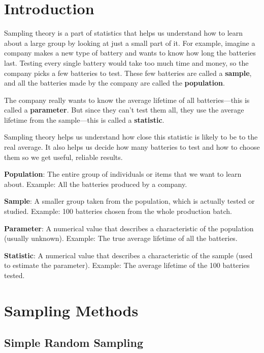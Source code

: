 \documentclass[twoside]{book}
\begin{document}
\section{Introduction}
Sampling theory is a part of statistics that helps us understand how to learn about a large group by looking at just a small part of it. For example, imagine a company makes a new type of battery and wants to know how long the batteries last. Testing every single battery would take too much time and money, so the company picks a few batteries to test. These few batteries are called a \textbf{sample}, and all the batteries made by the company are called the \textbf{population}.

The company really wants to know the average lifetime of all batteries—this is called a \textbf{parameter}. But since they can’t test them all, they use the average lifetime from the sample—this is called a \textbf{statistic}.

Sampling theory helps us understand how close this statistic is likely to be to the real average. It also helps us decide how many batteries to test and how to choose them so we get useful, reliable results.

\begin{textbox}
    \textbf{Population}: The entire group of individuals or items that we want to learn about.
    Example: All the batteries produced by a company.

    \vspace{3mm}
    \textbf{Sample}: A smaller group taken from the population, which is actually tested or studied.
    Example: 100 batteries chosen from the whole production batch.

    \vspace{3mm}
    \textbf{Parameter}: A numerical value that describes a characteristic of the population (usually unknown).
    Example: The true average lifetime of all the batteries.

    \vspace{3mm}
    \textbf{Statistic}: A numerical value that describes a characteristic of the sample (used to estimate the parameter).
    Example: The average lifetime of the 100 batteries tested.
\end{textbox}

\section{Sampling Methods}

\subsection{Simple Random Sampling}
\end{document}

